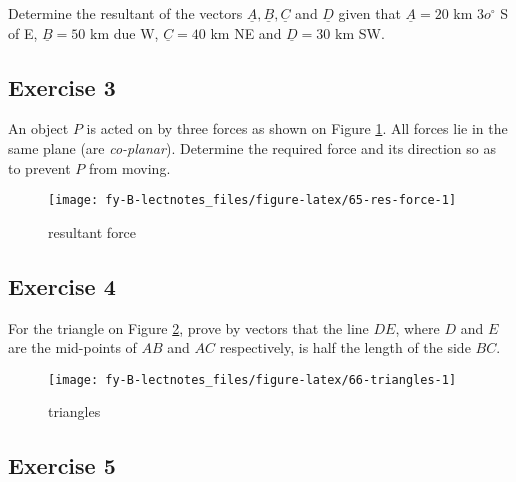 \documentclass[
  english,
  11pt,
  oneside]{book}
\newcommand{\slide}{}
\theoremstyle{definition}
\theoremstyle{definition}
\theoremstyle{definition}
\theoremstyle{definition}
\theoremstyle{remark}
\begin{document}
Determine the resultant of the vectors \(\underline A, \underline B, \underline C\) and \(\underline D\) given that \(\underline A = 20\) km \(3o^\circ\) S of E, \(\underline B = 50\) km due W, \(\underline C = 40\) km NE and \(\underline D=30\) km SW.

\slide

\subsection*{Exercise 3}\label{exercise-3-10}

An object \(P\) is acted on by three forces as shown on Figure \ref{fig:65-res-force}. All forces lie in the same plane (are \emph{co-planar}). Determine the required force and its direction so as to prevent \(P\) from moving.

\begin{figure}

{\centering \texttt{[image: fy-B-lectnotes\_files/figure-latex/65-res-force-1]} 

}

\caption{resultant force}\label{fig:65-res-force}
\end{figure}
\slide

\subsection*{Exercise 4}\label{exercise-4-8}

For the triangle on Figure \ref{fig:66-triangles}, prove by vectors that the line \(DE\), where \(D\) and \(E\) are the mid-points of \(AB\) and \(AC\) respectively, is half the length of the side \(BC\).

\begin{figure}

{\centering \texttt{[image: fy-B-lectnotes\_files/figure-latex/66-triangles-1]} 

}

\caption{triangles}\label{fig:66-triangles}
\end{figure}

\slide

\subsection*{Exercise 5}\label{exercise-5-6}
\end{document}
